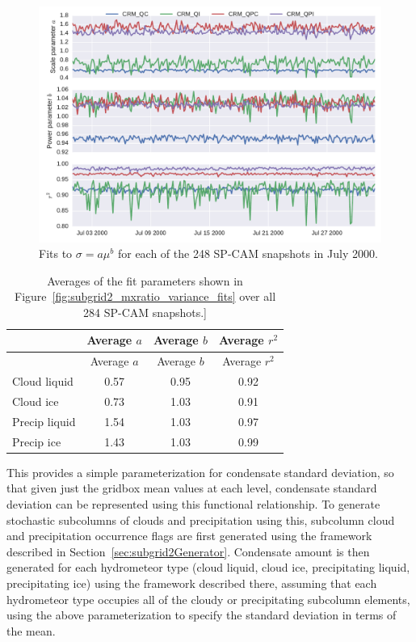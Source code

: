\begin{figure}[htbp]
\centering
\includegraphics{graphics/subgrid2_mxratio_variance_fits.pdf}
\caption{\label{fig:subgrid2_mxratio_variance_fits}Fits to
\(\sigma = a \mu^b\) for each of the 248 SP-CAM snapshots in July
2000.}\label{fig:subgrid2ux5fmxratioux5fvarianceux5ffits}
\end{figure}

\begin{longtable}[]{@{}lccc@{}}
\caption{\label{tbl:subgrid2_mxratio_variance_fits_table}Averages of the
fit parameters shown in Figure~\ref{fig:subgrid2_mxratio_variance_fits}
over all 284 SP-CAM snapshots.{]} }\tabularnewline
\toprule
& Average \(a\) & Average \(b\) & Average \(r^2\)\tabularnewline
\midrule
\endfirsthead
\toprule
& Average \(a\) & Average \(b\) & Average \(r^2\)\tabularnewline
\midrule
\endhead
Cloud liquid & 0.57 & 0.95 & 0.92\tabularnewline
Cloud ice & 0.73 & 1.03 & 0.91\tabularnewline
Precip liquid & 1.54 & 1.03 & 0.97\tabularnewline
Precip ice & 1.43 & 1.03 & 0.99\tabularnewline
\bottomrule
\end{longtable}

This provides a simple parameterization for condensate standard
deviation, so that given just the gridbox mean values at each level,
condensate standard deviation can be represented using this functional
relationship. To generate stochastic subcolumns of clouds and
precipitation using this, subcolumn cloud and precipitation occurrence
flags are first generated using the framework described in
Section~\ref{sec:subgrid2Generator}. Condensate amount is then generated
for each hydrometeor type (cloud liquid, cloud ice, precipitating
liquid, precipitating ice) using the framework described there, assuming
that each hydrometeor type occupies all of the cloudy or precipitating
subcolumn elements, using the above parameterization to specify the
standard deviation in terms of the mean.

